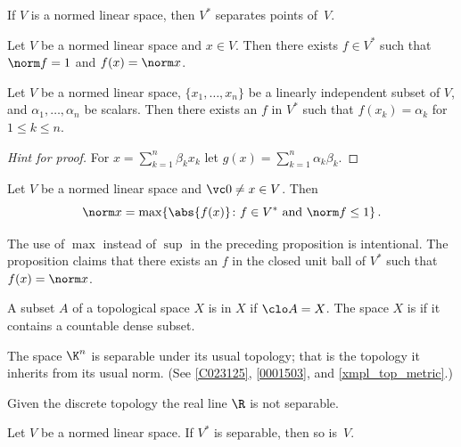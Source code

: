\begin{cor}\label{HBCorII} If $V$ is a normed linear space, then $V^*$ separates points of~$V$.
\end{cor}

\begin{cor}\label{HBCorIII} Let $V$ be a normed linear space and $x \in V$.  Then there exists
$f \in V^*$ such that $\norm f = 1$ and $f(x) = \norm x$.
\end{cor}

\begin{prop} Let $V$ be a normed linear space, $\{x_1,\dots,x_n\}$ be a linearly independent
subset of $V$, and $\alpha_1, \dots, \alpha_n$ be scalars. Then there exists an $f$ in
$V^*$ such that $f(x_k) = \alpha_k$ for $1\le k \le n$.
\end{prop}

\begin{proof}[\emph{Hint for proof}] For $x = \sum_{k=1}^n \beta_k x_k$ let $g(x) =
\sum_{k=1}^n \alpha_k \beta_k$.  \ns
\end{proof}

\begin{prop}\label{C067131} Let $V$ be a normed linear space and $\vc 0 \ne x \in V$.  Then
   \[ \norm x = \max\{\abs{f(x)}\colon f \in V^* \text{ and } \norm f \le 1\}\,. \]
\end{prop}

The use of $\max$ instead of $\sup$ in the preceding proposition is intentional.  The proposition claims that there
exists an $f$ in the closed unit ball of $V^*$ such that $f(x) = \norm x$.

\begin{defn} A subset $A$ of a topological space $X$ is
 in $X$ if $\clo A = X$.  The space $X$ is
 if it contains a countable dense subset.
\end{defn}

\begin{exam} The space $\K^n$ is separable under its usual topology; that is
the topology it inherits from its usual norm. (See \ref{C023125}, \ref{0001503}, and \ref{xmpl_top_metric}.)
\end{exam}

\begin{exam} Given the discrete topology the real line $\R$ is not separable.
\end{exam}

\begin{prop} Let $V$ be a normed linear space.  If $V^*$ is separable, then so is~$V$.
\end{prop}






















\endinput
